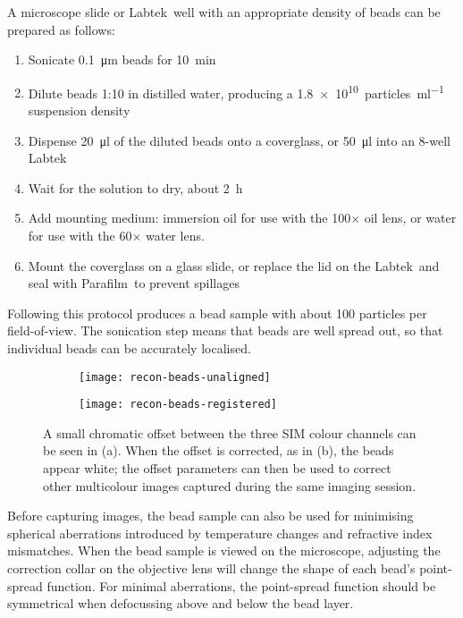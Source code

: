 A microscope slide or Labtek\texttrademark\ well with an appropriate density of beads can be prepared as follows:
\begin{enumerate}
	\item Sonicate \SI{0.1}{\micro\metre} beads for \SI{10}{\minute}
	\item Dilute beads 1:10 in distilled water, producing a \SI{1.8e10}{particles\per\milli\litre} suspension density
	\item Dispense \SI{20}{\micro\litre} of the diluted beads onto a coverglass, or \SI{50}{\micro\litre} into an 8-well Labtek
	\item Wait for the solution to dry, about \SI{2}{\hour}
	\item Add mounting medium: immersion oil for use with the 100$\times$ oil lens, or water for use with the 60$\times$ water lens.
	\item Mount the coverglass on a glass slide, or replace the lid on the Labtek\texttrademark\ and seal with Parafilm\texttrademark\  to prevent spillages
\end{enumerate}

Following this protocol produces a bead sample with about 100 particles per field-of-view.
The sonication step means that beads are well spread out, so that individual beads can be accurately localised.

\begin{figure}[p]
\centering
\begin{subfigure}[b]{0.49\textwidth}
	\texttt{[image: recon-beads-unaligned]}
	\caption{}\label{fig:recon-beads-unaligned}
\end{subfigure}
\hfill
\begin{subfigure}[b]{0.49\textwidth}
	\texttt{[image: recon-beads-registered]}
	\caption{}\label{fig:recon-beads-registered}
\end{subfigure}
\caption[LAG SIM: Multicolour alignment beads are used for correcting chromatic offset]{A small chromatic offset between the three SIM colour channels can be seen in (a). When the offset is corrected, as in (b), the beads appear white; the offset parameters can then be used to correct other multicolour images captured during the same imaging session.  }
\label{fig:recon-beads}
\end{figure}
\afterpage{\clearpage}

Before capturing images, the bead sample can also be used for minimising spherical aberrations introduced by temperature changes and refractive index mismatches.
When the bead sample is viewed on the microscope, adjusting the correction collar on the objective lens will change the shape of each bead's point-spread function.
For minimal aberrations, the point-spread function should be symmetrical when defocussing above and below the bead layer.

